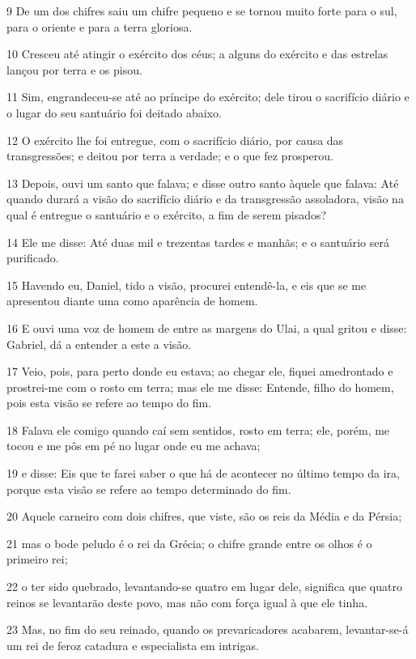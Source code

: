 \par 9 De um dos chifres saiu um chifre pequeno e se tornou muito forte para o sul, para o oriente e para a terra gloriosa.
\par 10 Cresceu até atingir o exército dos céus; a alguns do exército e das estrelas lançou por terra e os pisou.
\par 11 Sim, engrandeceu-se até ao príncipe do exército; dele tirou o sacrifício diário e o lugar do seu santuário foi deitado abaixo.
\par 12 O exército lhe foi entregue, com o sacrifício diário, por causa das transgressões; e deitou por terra a verdade; e o que fez prosperou.
\par 13 Depois, ouvi um santo que falava; e disse outro santo àquele que falava: Até quando durará a visão do sacrifício diário e da transgressão assoladora, visão na qual é entregue o santuário e o exército, a fim de serem pisados?
\par 14 Ele me disse: Até duas mil e trezentas tardes e manhãs; e o santuário será purificado.
\par 15 Havendo eu, Daniel, tido a visão, procurei entendê-la, e eis que se me apresentou diante uma como aparência de homem.
\par 16 E ouvi uma voz de homem de entre as margens do Ulai, a qual gritou e disse: Gabriel, dá a entender a este a visão.
\par 17 Veio, pois, para perto donde eu estava; ao chegar ele, fiquei amedrontado e prostrei-me com o rosto em terra; mas ele me disse: Entende, filho do homem, pois esta visão se refere ao tempo do fim.
\par 18 Falava ele comigo quando caí sem sentidos, rosto em terra; ele, porém, me tocou e me pôs em pé no lugar onde eu me achava;
\par 19 e disse: Eis que te farei saber o que há de acontecer no último tempo da ira, porque esta visão se refere ao tempo determinado do fim.
\par 20 Aquele carneiro com dois chifres, que viste, são os reis da Média e da Pérsia;
\par 21 mas o bode peludo é o rei da Grécia; o chifre grande entre os olhos é o primeiro rei;
\par 22 o ter sido quebrado, levantando-se quatro em lugar dele, significa que quatro reinos se levantarão deste povo, mas não com força igual à que ele tinha.
\par 23 Mas, no fim do seu reinado, quando os prevaricadores acabarem, levantar-se-á um rei de feroz catadura e especialista em intrigas.
